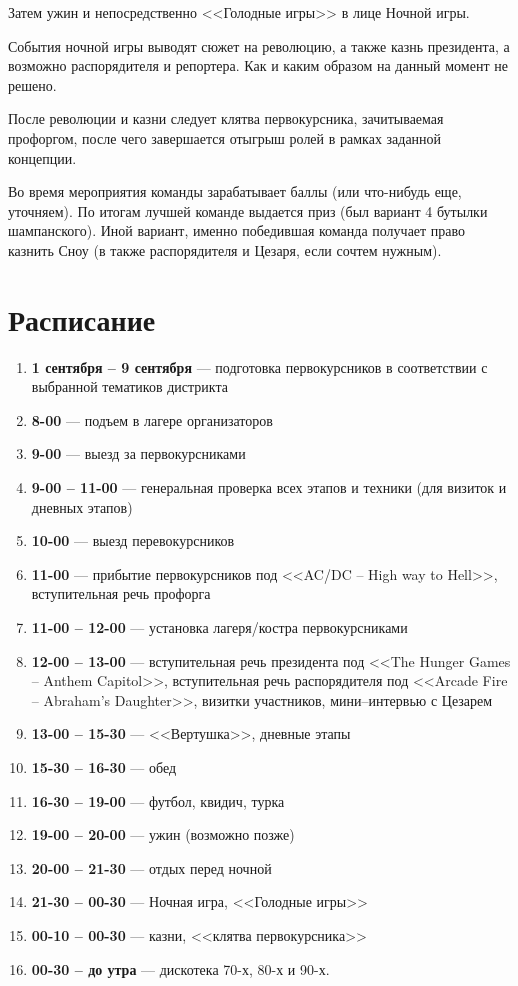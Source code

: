 \documentclass[a4paper, 14pt]{extarticle}
\theoremstyle{definition}
\begin{document}
\par Затем ужин и непосредственно <<Голодные игры>> в лице Ночной игры.

\par События ночной игры выводят сюжет на революцию, а также казнь президента, а возможно распорядителя и репортера. Как и каким образом на данный момент не решено.

\par После революции и казни следует клятва первокурсника, зачитываемая профоргом, после чего завершается отыгрыш ролей в рамках заданной концепции.

\par Во время мероприятия команды зарабатывает баллы (или что-нибудь еще, уточняем). По итогам лучшей команде выдается приз (был вариант 4 бутылки шампанского). Иной вариант, именно победившая команда получает право казнить Сноу (в также распорядителя и Цезаря, если сочтем нужным).

\cleardoublepage
{}
{}
\section*{Расписание}

\begin{enumerate}
\item \textbf{1 сентября -- 9 сентября} --- подготовка первокурсников в соответствии с выбранной тематиков дистрикта
\item \textbf{8-00} --- подъем в лагере организаторов
\item \textbf{9-00} --- выезд за первокурсниками
\item \textbf{9-00 -- 11-00} --- генеральная проверка всех этапов и техники (для визиток и дневных этапов)
\item \textbf{10-00} --- выезд перевокурсников
\item \textbf{11-00} --- прибытие первокурсников под <<AC/DC -- High way to Hell>>, вступительная речь профорга
\item \textbf{11-00 -- 12-00} --- установка лагеря/костра первокурсниками
\item \textbf{12-00 -- 13-00} --- вступительная речь президента под <<The Hunger Games -- Anthem Capitol>>, вступительная речь распорядителя под <<Arcade Fire -- Abraham's Daughter>>, визитки участников, мини--интервью с Цезарем
\item \textbf{13-00 -- 15-30} --- <<Вертушка>>, дневные этапы
\item \textbf{15-30 -- 16-30} --- обед
\item \textbf{16-30 -- 19-00} --- футбол, квидич, турка
\item \textbf{19-00 -- 20-00} --- ужин (возможно позже)
\item \textbf{20-00 -- 21-30} --- отдых перед ночной
\item \textbf{21-30 -- 00-30} --- Ночная игра, <<Голодные игры>>
\item \textbf{00-10 -- 00-30} --- казни, <<клятва первокурсника>>
\item \textbf{00-30 -- до утра} --- дискотека 70-х, 80-х и 90-х.
\end{enumerate}
\end{document}
